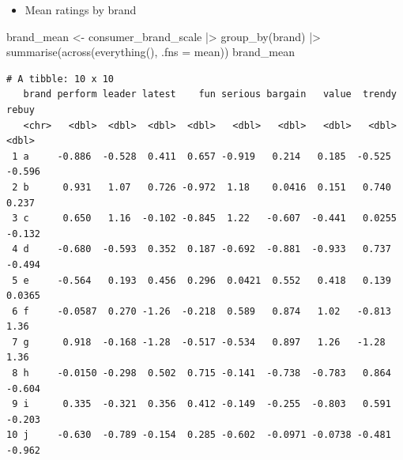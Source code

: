 \documentclass[
  ignorenonframetext,
]{beamer}
\newenvironment{Shaded}{\begin{snugshade}}{\end{snugshade}}
\newcommand{\AttributeTok}[1]{\textcolor[rgb]{0.40,0.45,0.13}{#1}}
\newcommand{\FunctionTok}[1]{\textcolor[rgb]{0.28,0.35,0.67}{#1}}
\newcommand{\NormalTok}[1]{\textcolor[rgb]{0.00,0.23,0.31}{#1}}
\newcommand{\OtherTok}[1]{\textcolor[rgb]{0.00,0.23,0.31}{#1}}
\newcommand{\SpecialCharTok}[1]{\textcolor[rgb]{0.37,0.37,0.37}{#1}}
\providecommand{\tightlist}{%
  \setlength{\itemsep}{0pt}\setlength{\parskip}{0pt}}\usepackage{longtable,booktabs,array}
\begin{document}
\begin{frame}[fragile]{}
\label{section-8}
\begin{itemize}
\tightlist
\item
  Mean ratings by brand
\end{itemize}

\tiny

\begin{Shaded}
\begin{Highlighting}[]
\NormalTok{brand\_mean }\OtherTok{\textless{}{-}}\NormalTok{ consumer\_brand\_scale }\SpecialCharTok{|\textgreater{}} 
  \FunctionTok{group\_by}\NormalTok{(brand) }\SpecialCharTok{|\textgreater{}} 
  \FunctionTok{summarise}\NormalTok{(}\FunctionTok{across}\NormalTok{(}\FunctionTok{everything}\NormalTok{(), }\AttributeTok{.fns =}\NormalTok{ mean))}
\NormalTok{brand\_mean}
\end{Highlighting}
\end{Shaded}

\begin{verbatim}
# A tibble: 10 x 10
   brand perform leader latest    fun serious bargain   value  trendy   rebuy
   <chr>   <dbl>  <dbl>  <dbl>  <dbl>   <dbl>   <dbl>   <dbl>   <dbl>   <dbl>
 1 a     -0.886  -0.528  0.411  0.657 -0.919   0.214   0.185  -0.525  -0.596 
 2 b      0.931   1.07   0.726 -0.972  1.18    0.0416  0.151   0.740   0.237 
 3 c      0.650   1.16  -0.102 -0.845  1.22   -0.607  -0.441   0.0255 -0.132 
 4 d     -0.680  -0.593  0.352  0.187 -0.692  -0.881  -0.933   0.737  -0.494 
 5 e     -0.564   0.193  0.456  0.296  0.0421  0.552   0.418   0.139   0.0365
 6 f     -0.0587  0.270 -1.26  -0.218  0.589   0.874   1.02   -0.813   1.36  
 7 g      0.918  -0.168 -1.28  -0.517 -0.534   0.897   1.26   -1.28    1.36  
 8 h     -0.0150 -0.298  0.502  0.715 -0.141  -0.738  -0.783   0.864  -0.604 
 9 i      0.335  -0.321  0.356  0.412 -0.149  -0.255  -0.803   0.591  -0.203 
10 j     -0.630  -0.789 -0.154  0.285 -0.602  -0.0971 -0.0738 -0.481  -0.962 
\end{verbatim}
\end{frame}
\end{document}
